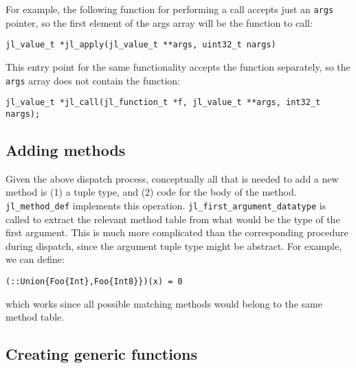 For example, the following function for performing a call accepts just an \texttt{args} pointer, so the first element of the args array will be the function to call:




\begin{lstlisting}
jl_value_t *jl_apply(jl_value_t **args, uint32_t nargs)
\end{lstlisting}



This entry point for the same functionality accepts the function separately, so the \texttt{args} array does not contain the function:




\begin{lstlisting}
jl_value_t *jl_call(jl_function_t *f, jl_value_t **args, int32_t nargs);
\end{lstlisting}



\hypertarget{17618724806250544535}{}


\subsection{Adding methods}



Given the above dispatch process, conceptually all that is needed to add a new method is (1) a tuple type, and (2) code for the body of the method. \texttt{jl\_method\_def} implements this operation. \texttt{jl\_first\_argument\_datatype} is called to extract the relevant method table from what would be the type of the first argument. This is much more complicated than the corresponding procedure during dispatch, since the argument tuple type might be abstract. For example, we can define:




\begin{verbatim}
(::Union{Foo{Int},Foo{Int8}})(x) = 0
\end{verbatim}



which works since all possible matching methods would belong to the same method table.



\hypertarget{16014622082824674579}{}


\subsection{Creating generic functions}



